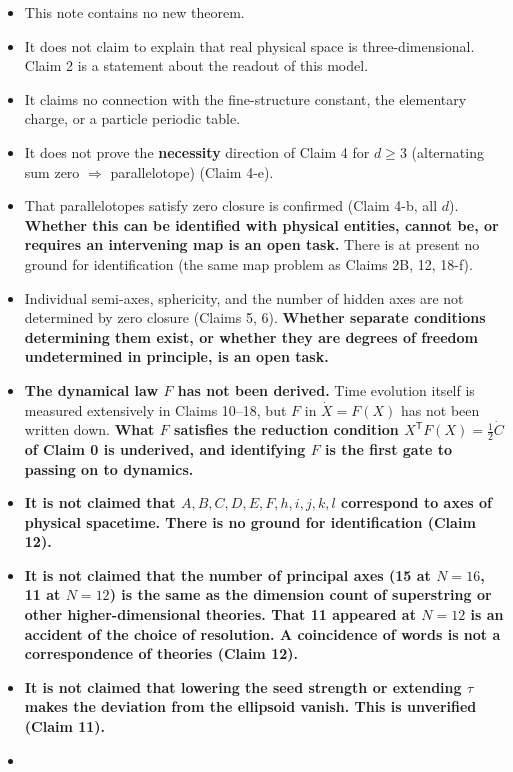 \documentclass[
  10pt,
]{article}
\providecommand{\tightlist}{%
  \setlength{\itemsep}{0pt}\setlength{\parskip}{0pt}}
\begin{document}
\begin{itemize}
\tightlist
\item
  This note contains no new theorem.
\item
  It does not claim to explain that real physical space is
  three-dimensional. Claim 2 is a statement about the readout of this
  model.
\item
  It claims no connection with the fine-structure constant, the
  elementary charge, or a particle periodic table.
\item
  It does not prove the \textbf{necessity} direction of Claim 4 for
  \(d\ge3\) (alternating sum zero \(\Rightarrow\) parallelotope) (Claim
  4-e).
\item
  That parallelotopes satisfy zero closure is confirmed (Claim 4-b, all
  \(d\)). \textbf{Whether this can be identified with physical entities,
  cannot be, or requires an intervening map is an open task.} There is
  at present no ground for identification (the same map problem as
  Claims 2B, 12, 18-f).
\item
  Individual semi-axes, sphericity, and the number of hidden axes are
  not determined by zero closure (Claims 5, 6). \textbf{Whether separate
  conditions determining them exist, or whether they are degrees of
  freedom undetermined in principle, is an open task.}
\item
  \textbf{The dynamical law \(F\) has not been derived.} Time evolution
  itself is measured extensively in Claims 10--18, but \(F\) in
  \(\dot X = F(X)\) has not been written down. \textbf{What \(F\)
  satisfies the reduction condition
  \(X^{\mathsf T}F(X) = \tfrac12\dot C\) of Claim 0 is underived, and
  identifying \(F\) is the first gate to passing on to dynamics.}
\item
  \textbf{It is not claimed that \(A,B,C,D,E,F,h,i,j,k,l\) correspond to
  axes of physical spacetime. There is no ground for identification
  (Claim 12).}
\item
  \textbf{It is not claimed that the number of principal axes (15 at
  \(N=16\), 11 at \(N=12\)) is the same as the dimension count of
  superstring or other higher-dimensional theories. That 11 appeared at
  \(N=12\) is an accident of the choice of resolution. A coincidence of
  words is not a correspondence of theories (Claim 12).}
\item
  \textbf{It is not claimed that lowering the seed strength or extending
  \(\tau\) makes the deviation from the ellipsoid vanish. This is
  unverified (Claim 11).}
\item

\end{itemize}
\end{document}
